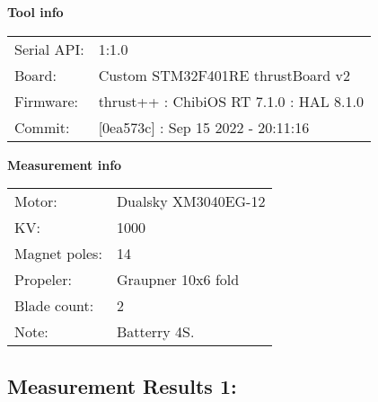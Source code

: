 \documentclass[10pt]{article}
\begin{document}
\noindent
{\large \bf Tool info}
\vspace{3mm}

\noindent
\begin{tabular}{ll}
Serial API:  & 1:1.0\\ 
Board:       & Custom STM32F401RE thrustBoard v2\\ 
Firmware:    & thrust++ : ChibiOS RT 7.1.0 : HAL 8.1.0\\ 
Commit:      & [0ea573c] : Sep 15 2022 - 20:11:16
\end{tabular}
\vspace{3mm}

\noindent
{\large \bf Measurement info}
\vspace{3mm}

\noindent
\begin{tabular}{ll}
Motor:        & Dualsky XM3040EG-12\\ 
KV:           & 1000\\ 
Magnet poles: & 14\\ 
Propeler:     & Graupner 10x6 fold\\ 
Blade count:  & 2\\ 
Note:         & Batterry 4S.
\end{tabular}

\vspace{3mm}


\subsection*{\large \bf Measurement Results 1:}
\end{document}
